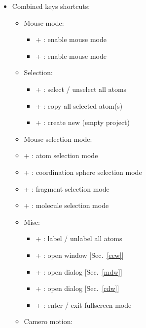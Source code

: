 {\begin{itemize}
\begin{itemize}
\begin{itemize}
\begin{itemize}
\end{itemize}
\end{itemize}
\item Combined keys shortcuts: 
\begin{itemize}
\item Mouse mode: 
\begin{itemize}
\item[] \Alt +  : enable mouse  mode
\item[] \Alt +  : enable mouse  mode
\end{itemize}
\item Selection:
\begin{itemize}
\item[] \Ctrl +  : select / unselect all atoms
\item[] \Ctrl +  : copy all selected atom(s)
\item[] \Ctrl +  : create new (empty project)
\end{itemize}
\item Mouse selection mode:
\item[] \Shift + : atom selection mode
\item[] \Shift + : coordination sphere selection mode
\item[] \Shift + : fragment selection mode
\item[] \Shift + : molecule selection mode 
\item Misc: 
\begin{itemize}
\item[] \Ctrl +  : label / unlabel all atoms 
\item[] \Ctrl +  : open  window [Sec.~\ref{ecw}]
\item[] \Ctrl +  : open  dialog [Sec.~\ref{mdw}]
\item[] \Ctrl +  : open  dialog [Sec.~\ref{rdw}]
\item[] \Ctrl +  : enter / exit fullscreen mode 
\end{itemize}
\item Camero motion: 
\begin{itemize}

\end{itemize}
\end{itemize}
\end{itemize}
\end{itemize}}
